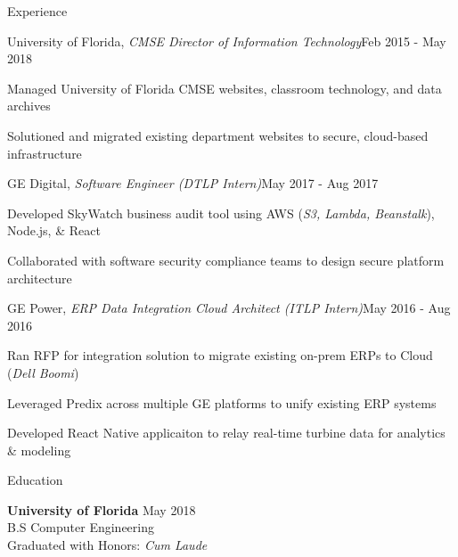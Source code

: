 \documentclass{resume} %
\begin{document}
\begin{rSection}{Experience}
\begin{rSubsection}{University of Florida, \textit{CMSE Director of Information Technology}}{Feb 2015 - May 2018}{}{}
\setlength{\itemindent}{.25in}
\item Managed University of Florida CMSE websites, classroom technology, and data archives
\item Solutioned and migrated existing department websites to secure, cloud-based infrastructure
\end{rSubsection}

\begin{rSubsection}{GE Digital, \textit{Software Engineer (DTLP Intern)}}{May 2017 - Aug 2017}{}{}
\setlength{\itemindent}{.25in}
\item Developed SkyWatch business audit tool using AWS (\textit{S3, Lambda, Beanstalk}), Node.js, \& React
\item Collaborated with software security compliance teams to design secure platform architecture
\end{rSubsection}

\begin{rSubsection}{GE Power, \textit{ERP Data Integration Cloud Architect (ITLP Intern)}}{May 2016 - Aug 2016}{}{}
\setlength{\itemindent}{.25in}
\item Ran RFP for integration solution to migrate existing on-prem ERPs to Cloud (\textit{Dell Boomi})
\item Leveraged Predix across multiple GE platforms to unify existing ERP systems
\item Developed React Native applicaiton to relay real-time turbine data for analytics \& modeling
\end{rSubsection}

\end{rSection}

\begin{rSection}{Education}

    {\bf University of Florida} \hfill {May 2018} 
    \\ B.S Computer Engineering
    \\ Graduated with Honors: \textit{Cum Laude}
    
    \end{rSection}
\end{document}
